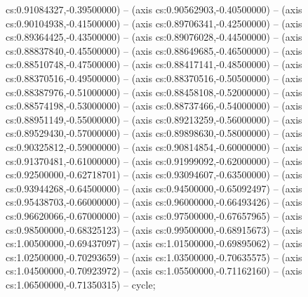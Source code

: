 cs:0.91084327,-0.39500000) -- (axis cs:0.90562903,-0.40500000) -- (axis cs:0.90104938,-0.41500000) -- (axis cs:0.89706341,-0.42500000) -- (axis cs:0.89364425,-0.43500000) -- (axis cs:0.89076028,-0.44500000) -- (axis cs:0.88837840,-0.45500000) -- (axis cs:0.88649685,-0.46500000) -- (axis cs:0.88510748,-0.47500000) -- (axis cs:0.88417141,-0.48500000) -- (axis cs:0.88370516,-0.49500000) -- (axis cs:0.88370516,-0.50500000) -- (axis cs:0.88387976,-0.51000000) -- (axis cs:0.88458108,-0.52000000) -- (axis cs:0.88574198,-0.53000000) -- (axis cs:0.88737466,-0.54000000) -- (axis cs:0.88951149,-0.55000000) -- (axis cs:0.89213259,-0.56000000) -- (axis cs:0.89529430,-0.57000000) -- (axis cs:0.89898630,-0.58000000) -- (axis cs:0.90325812,-0.59000000) -- (axis cs:0.90814854,-0.60000000) -- (axis cs:0.91370481,-0.61000000) -- (axis cs:0.91999092,-0.62000000) -- (axis cs:0.92500000,-0.62718701) -- (axis cs:0.93094607,-0.63500000) -- (axis cs:0.93944268,-0.64500000) -- (axis cs:0.94500000,-0.65092497) -- (axis cs:0.95438703,-0.66000000) -- (axis cs:0.96000000,-0.66493426) -- (axis cs:0.96620066,-0.67000000) -- (axis cs:0.97500000,-0.67657965) -- (axis cs:0.98500000,-0.68325123) -- (axis cs:0.99500000,-0.68915673) -- (axis cs:1.00500000,-0.69437097) -- (axis cs:1.01500000,-0.69895062) -- (axis cs:1.02500000,-0.70293659) -- (axis cs:1.03500000,-0.70635575) -- (axis cs:1.04500000,-0.70923972) -- (axis cs:1.05500000,-0.71162160) -- (axis cs:1.06500000,-0.71350315) -- cycle;
